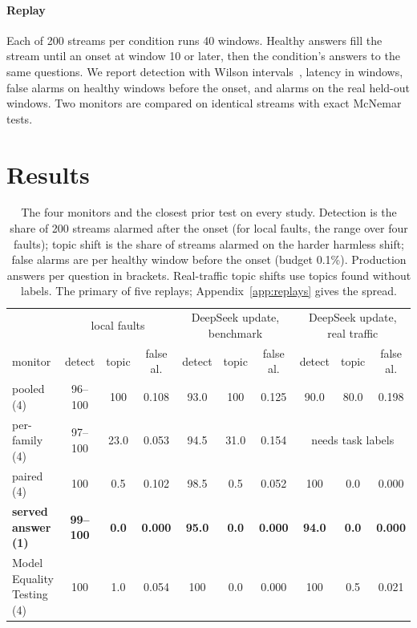 \documentclass{article}
\begin{document}
\paragraph{Replay} Each of 200 streams per condition runs 40 windows. Healthy
answers fill the stream until an onset at window 10 or later, then the condition's
answers to the same questions. We report detection with Wilson
intervals~\citep{wilson1927probable}, latency in windows, false alarms on healthy
windows before the onset, and alarms on the real held-out windows. Two monitors
are compared on identical streams with exact McNemar tests.

\section{Results}
\label{sec:results}

\begin{table}[t]
  \centering\small
  \caption{The four monitors and the closest prior test on every study. Detection
  is the share of 200 streams alarmed after the onset (for local faults, the range
  over four faults); topic shift is the share of streams alarmed on the harder
  harmless shift; false alarms are per healthy window before the onset (budget
  0.1\%). Production answers per question in brackets. Real-traffic topic shifts
  use topics found without labels. The primary of five replays; Appendix~\ref{app:replays}
  gives the spread.}
  \label{tab:monitors}
  \setlength{\tabcolsep}{3.6pt}
  \begin{tabular}{l|ccc|ccc|ccc}
    \toprule
    & \multicolumn{3}{c|}{local faults} & \multicolumn{3}{c|}{DeepSeek update, benchmark} & \multicolumn{3}{c}{DeepSeek update, real traffic} \\
    monitor & detect & topic & false al. & detect & topic & false al. & detect & topic & false al. \\
    \midrule
    pooled (4) & 96--100 & 100 & 0.108 & 93.0 & 100 & 0.125 & 90.0 & 80.0 & 0.198 \\
    per-family (4) & 97--100 & 23.0 & 0.053 & 94.5 & 31.0 & 0.154 & \multicolumn{3}{c}{needs task labels} \\
    paired (4) & 100 & 0.5 & 0.102 & 98.5 & 0.5 & 0.052 & 100 & 0.0 & 0.000 \\
    \textbf{served answer (1)} & \textbf{99--100} & \textbf{0.0} & \textbf{0.000} & \textbf{95.0} & \textbf{0.0} & \textbf{0.000} & \textbf{94.0} & \textbf{0.0} & \textbf{0.000} \\
    \midrule
    Model Equality Testing (4) & 100 & 1.0 & 0.054 & 100 & 0.0 & 0.000 & 100 & 0.5 & 0.021 \\
    \bottomrule
  \end{tabular}
\end{table}
\end{document}
